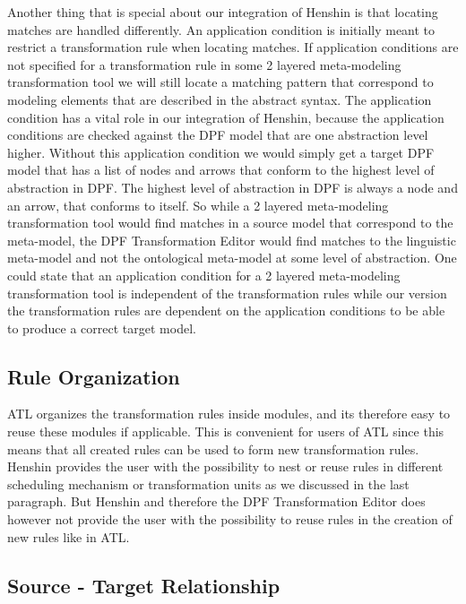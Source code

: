 Another thing that is special about our integration of Henshin is that locating
matches are handled differently. An application condition is initially meant to
restrict a transformation rule when locating matches. If application conditions
are not specified for a transformation rule in some 2 layered meta-modeling
transformation tool we will still locate a matching pattern that correspond to
modeling elements that are described in the abstract syntax. The application
condition has a vital role in our integration of Henshin, because the
application conditions are checked against the DPF model that are one
abstraction level higher. Without this application condition we would simply get
a target DPF model that has a list of nodes and arrows that conform to the
highest level of abstraction in DPF. The highest level of abstraction in DPF
is always a node and an arrow, that conforms to itself. So while a 2 layered
meta-modeling transformation tool would find matches in a source model that
correspond to the meta-model, the DPF Transformation Editor would find matches to
the linguistic meta-model and not the ontological meta-model at some level of
abstraction. One could state that an application condition for a 2 layered
meta-modeling transformation tool is independent of the transformation rules
while our version the transformation rules are dependent on the application
conditions to be able to produce a correct target model. 

\subsection{Rule Organization}

ATL organizes the transformation rules inside modules, and its therefore easy to
reuse these modules if applicable. This is convenient for
users of ATL since this means that all created rules can be used to form new
transformation rules. Henshin provides the user with the possibility to nest or 
reuse rules in different scheduling mechanism or transformation units
as we discussed in the last paragraph. But Henshin and therefore the DPF
Transformation Editor does however not provide the user with the possibility to
reuse rules in the creation of new rules like in ATL. 

\subsection{Source - Target Relationship}

